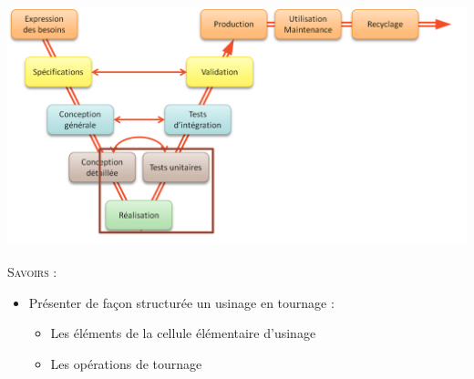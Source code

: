\documentclass[11pt,oneside]{article}
\begin{document}
\vspace{.5cm}

\begin{center}
\includegraphics[height=7cm]{png/cycleV}
\end{center}






\begin{savoir}
\textsc{Savoirs :}
\begin{itemize}
\item Présenter de façon structurée un usinage en tournage :
\begin{itemize}
\item Les éléments de la cellule élémentaire d'usinage
\item Les opérations de tournage
\end{itemize}
\end{itemize}
\end{savoir}
 

\setlength{\parskip}{0ex plus 0.2ex minus 0ex}
 \renewcommand{\contentsname}{}
 \renewcommand{\baselinestretch}{1}
\end{document}
